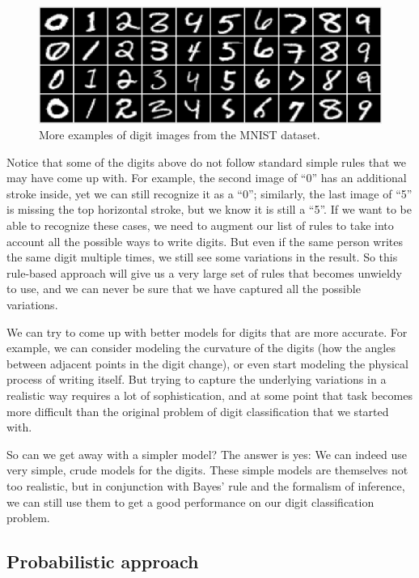 \documentclass[11pt]{article}
\begin{document}
\begin{figure}[h!]
\centering
\includegraphics[scale=0.35]{digits2.png}
\caption{More examples of digit images from the MNIST dataset.}
\label{fig:digits2}
\end{figure}

Notice that some of the digits above do not follow standard simple rules that we may have come up with. For example, the second image of ``0'' has an additional stroke inside, yet we can still recognize it as a ``0''; similarly, the last image of ``5'' is missing the top horizontal stroke, but we know it is still a ``5''. If we want to be able to recognize these cases, we need to augment our list of rules to take into account all the possible ways to write digits. But even if the same person writes the same digit multiple times, we still see some variations in the result. So this rule-based approach will give us a very large set of rules that becomes unwieldy to use, and we can never be sure that we have captured all the possible variations.

We can try to come up with better models for digits that are more accurate. For example, we can consider modeling the curvature of the digits (how the angles between adjacent points in the digit change), or even start modeling the physical process of writing itself. But trying to capture the underlying variations in a realistic way requires a lot of sophistication, and at some point that task becomes more difficult than the original problem of digit classification that we started with.

So can we get away with a simpler model? The answer is yes: We can indeed use very simple, crude models for the digits. These simple models are themselves not too realistic, but in conjunction with Bayes' rule and the formalism of inference, we can still use them to get a good performance on our digit classification problem.




\subsection*{Probabilistic approach}
\end{document}

